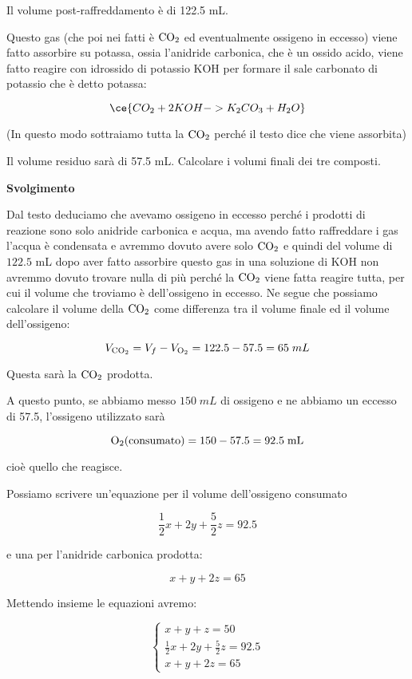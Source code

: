 Il volume post-raffreddamento è di 122.5 mL.

Questo gas (che poi nei fatti è $\rm CO_2$ ed eventualmente ossigeno in eccesso) viene fatto assorbire su potassa, ossia l'anidride carbonica, che è un ossido acido, viene fatto reagire con idrossido di potassio KOH per formare il sale carbonato di potassio che è detto potassa:

$$\ce{CO_2 + 2KOH -> K_2CO_3 + H_2O}$$

(In questo modo sottraiamo tutta la $\rm CO_2$ perché il testo dice che viene assorbita)

Il volume residuo sarà di 57.5 mL. Calcolare i volumi finali dei tre composti.

\vspace{0.2cm}\large\textbf{Svolgimento}\normalsize

\vspace{0.2cm} Dal testo deduciamo che avevamo ossigeno in eccesso perché i prodotti di reazione sono solo anidride carbonica e acqua, ma avendo fatto raffreddare i gas l'acqua è condensata e avremmo dovuto avere solo $\rm CO_2$ e quindi del volume di $122.5$ mL dopo aver fatto assorbire questo gas in una soluzione di KOH non avremmo dovuto trovare nulla di più perché la $\rm CO_2$ viene fatta reagire tutta, per cui il volume che troviamo è dell'ossigeno in eccesso. Ne segue che possiamo calcolare il volume della $\rm CO_2$ come differenza tra il volume finale ed il volume dell'ossigeno:

$$V_{\rm CO_2}=V_f - V_{\rm O_2}=122.5 -57.5=65\;mL$$

Questa sarà la $\rm CO_2$ prodotta.

A questo punto, se abbiamo messo $150\;mL$ di ossigeno e ne abbiamo un eccesso di 57.5, l'ossigeno utilizzato sarà

$$\rm O{_2}(consumato)=150-57.5=92.5\;mL$$

cioè quello che reagisce.

Possiamo scrivere un'equazione per il volume dell'ossigeno consumato

$$\frac{1}{2}x + 2y + \frac{5}{2}z=92.5$$

e una per l'anidride carbonica prodotta:

$$x+y+2z=65$$

Mettendo insieme le equazioni avremo:

$$\begin{cases}
    x+y+z=50\\
    \displaystyle \frac{1}{2}x + 2y + \displaystyle \frac{5}{2}z=92.5\\
    x+y+2z=65
\end{cases}$$

